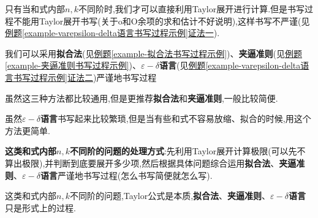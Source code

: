 \documentclass[lang=cn,newtx,10pt,scheme=chinese]{elegantbook}
\begin{document}
只有当和式内部$n,k$不同阶时,我们才可以直接利用Taylor展开进行计算.但是书写过程不能用Taylor展开书写(关于o和O余项的求和估计不好说明),这样书写不严谨(见\hyperref[example-varepsilon-delta语言书写过程示例]{例题\ref{example-varepsilon-delta语言书写过程示例}证法一}).

我们可以采用\textbf{拟合法}(见\hyperref[example-拟合法书写过程示例]{例题\ref{example-拟合法书写过程示例}})、\textbf{夹逼准则}(见\hyperref[example-夹逼准则书写过程示例]{例题\ref{example-夹逼准则书写过程示例}})、\textbf{$\varepsilon-\delta$语言}(见\hyperref[example-varepsilon-delta语言书写过程示例]{例题\ref{example-varepsilon-delta语言书写过程示例}证法二})严谨地书写过程

\begin{note}
虽然这三种方法都比较通用,但是更推荐\textbf{拟合法}和\textbf{夹逼准则},一般比较简便.

虽然\textbf{$\varepsilon-\delta$语言}书写起来比较繁琐,但是当有些和式不容易放缩、拟合的时候,用这个方法更简单.
\end{note}

\textbf{这类和式内部$n,k$不同阶的问题的处理方式}:先利用Taylor展开计算极限(可以先不算出极限),并判断到底要展开多少项,然后根据具体问题综合运用\textbf{拟合法}、\textbf{夹逼准则}、\textbf{$\varepsilon-\delta$语言}严谨地书写过程(怎么书写简便就怎么写).

\begin{remark}
这类和式内部$n,k$不同阶的问题,Taylor公式是本质,\textbf{拟合法}、\textbf{夹逼准则}、\textbf{$\varepsilon-\delta$语言}只是形式上的过程.
\end{remark}
\end{document}
